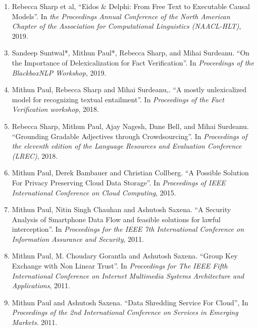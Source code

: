 \documentclass[10pt]{article}
\newcommand{\ve}[1]{{\em #1}} %
\newcommand{\ti}[1]{``#1''} %
\begin{document}
\begin{description}
\begin{enumerate}
\item  Rebecca Sharp et al,   \ti{Eidos \& Delphi: From Free Text to Executable Causal Models}. In \ve{ the Proceedings Annual Conference of the North American Chapter of the Association for Computational Linguistics (NAACL-HLT)}, 2019.

\end{enumerate}


\begin{enumerate}
\setcounter{enumi}{2}




\item Sandeep Suntwal*, Mithun Paul*, Rebecca Sharp, and Mihai Surdeanu.   \ti{On the Importance of Delexicalization for Fact Verification}. In \ve{Proceedings of the BlackboxNLP Workshop}, 2019.

\item Mithun Paul, Rebecca Sharp and Mihai Surdeanu,.   \ti{A mostly unlexicalized model for recognizing textual entailment}. In \ve{Proceedings of the Fact Verification workshop}, 2018.

\item Rebecca Sharp, Mithun Paul, Ajay Nagesh, Dane  Bell, and Mihai Surdeanu.   \ti{Grounding Gradable Adjectives through Crowdsourcing}. In \ve{Proceedings of the eleventh edition of the Language Resources and Evaluation Conference (LREC)}, 2018.

\item Mithun Paul, Derek Bambauer and Christian Collberg.   \ti{A Possible Solution For Privacy Preserving Cloud Data Storage}. In \ve{Proceedings of IEEE International Conference on Cloud Computing}, 2015.

\item  Mithun Paul, Nitin Singh Chauhan and Ashutosh Saxena.   \ti{A Security Analysis of Smartphone Data Flow and feasible solutions for lawful interception}. In \ve{ Proceedings for the IEEE 7th International Conference on Information Assurance and Security}, 2011.

\item  Mithun Paul, M. Choudary Gorantla and Ashutosh Saxena.   \ti{Group Key Exchange with Non Linear Trust}. In \ve{ Proceedings for The IEEE Fifth International Conference on Internet Multimedia Systems Architecture and Applications}, 2011.

\item  Mithun Paul and Ashutosh Saxena.   \ti{Data Shredding Service For Cloud}, In \ve{  Proceedings of the 2nd International Conference on Services in Emerging Markets}. 2011.


\end{enumerate}
\end{description}
\end{document}
